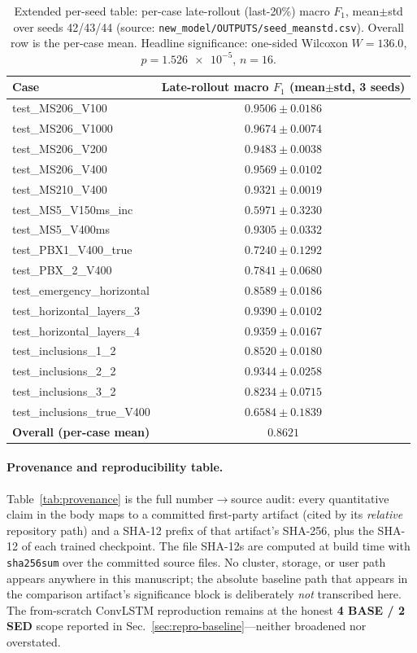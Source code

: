 \documentclass[11pt]{article}
\begin{document}
\begin{table}[hb]
\centering
\caption{Extended per-seed table: per-case late-rollout (last-20\%) macro $F_1$,
mean$\pm$std over seeds 42/43/44 (source:
\texttt{new\_model/OUTPUTS/seed\_meanstd.csv}). Overall row is the per-case mean.
Headline significance: one-sided Wilcoxon $W{=}136.0$, $p{=}\num{1.526e-5}$,
$n{=}16$.}
\label{tab:perseed}
\small
\begin{tabular}{lc}
\toprule
Case & Late-rollout macro $F_1$ (mean$\pm$std, 3 seeds) \\
\midrule
test\_MS206\_V100            & $0.9506 \pm 0.0186$ \\
test\_MS206\_V1000           & $0.9674 \pm 0.0074$ \\
test\_MS206\_V200            & $0.9483 \pm 0.0038$ \\
test\_MS206\_V400            & $0.9569 \pm 0.0102$ \\
test\_MS210\_V400            & $0.9321 \pm 0.0019$ \\
test\_MS5\_V150ms\_inc       & $0.5971 \pm 0.3230$ \\
test\_MS5\_V400ms            & $0.9305 \pm 0.0332$ \\
test\_PBX1\_V400\_true       & $0.7240 \pm 0.1292$ \\
test\_PBX\_2\_V400           & $0.7841 \pm 0.0680$ \\
test\_emergency\_horizontal  & $0.8589 \pm 0.0186$ \\
test\_horizontal\_layers\_3  & $0.9390 \pm 0.0102$ \\
test\_horizontal\_layers\_4  & $0.9359 \pm 0.0167$ \\
test\_inclusions\_1\_2       & $0.8520 \pm 0.0180$ \\
test\_inclusions\_2\_2       & $0.9344 \pm 0.0258$ \\
test\_inclusions\_3\_2       & $0.8234 \pm 0.0715$ \\
test\_inclusions\_true\_V400 & $0.6584 \pm 0.1839$ \\
\midrule
\textbf{Overall (per-case mean)} & $\mathbf{0.8621}$ \\
\bottomrule
\end{tabular}
\end{table}

\paragraph{Provenance and reproducibility table.}
Table~\ref{tab:provenance} is the full number$\rightarrow$source audit: every
quantitative claim in the body maps to a committed first-party artifact (cited by
its \emph{relative} repository path) and a SHA-12 prefix of that artifact's
SHA-256, plus the SHA-12 of each trained checkpoint. The file SHA-12s are computed
at build time with \texttt{sha256sum} over the committed source files. No cluster,
storage, or user path appears anywhere in this manuscript; the absolute baseline
path that appears in the comparison artifact's significance block is deliberately
\emph{not} transcribed here. The from-scratch ConvLSTM reproduction remains at the
honest \textbf{4 BASE / 2 SED} scope reported in
Sec.~\ref{sec:repro-baseline}---neither broadened nor overstated.
\end{document}

